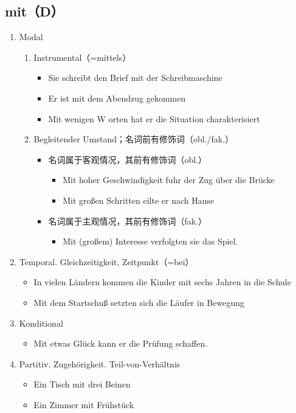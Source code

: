 \documentclass[UTF8]{report}
\begin{document}
\subsection{mit（D）}
\begin{enumerate}
    \item Modal
    \begin{enumerate}
        \item Instrumental（=mittels）
        \begin{itemize}
            \item Sie schreibt den Brief mit der Schreibmaschine
            \item Er ist mit dem Abendzug gekommen
            \item Mit wenigen W orten hat er die Situation charakterisiert
        \end{itemize}
        \item Begleitender Umstand；名词前有修饰词（obl./fak.）
        \begin{itemize}
            \item 名词属于客观情况，其前有修饰词（obl.）
            \begin{itemize}
                \item Mit hoher Geschwindigkeit fuhr der Zug über die Brücke
                \item Mit großen Schritten eilte er nach Hause
            \end{itemize}
            \item 名词属于主观情况，其前有修饰词（fak.）
            \begin{itemize}
                \item Mit (großem) Interesse verfolgten sie das Spiel.
            \end{itemize}
        \end{itemize}
    \end{enumerate}
    \item Temporal. Gleichzeitigkeit, Zeitpunkt（=bei）
    \begin{itemize}
        \item In vielen Ländern kommen die Kinder mit sechs Jahren in die Schule
        \item Mit dem Startschuß setzten sich die Läufer in Bewegung
    \end{itemize}
    \item Konditional
    \begin{itemize}
        \item Mit etwas Glück kann er die Prüfung schaffen.
    \end{itemize}
    \item Partitiv. Zugehörigkeit. Teil-von-Verhältnis
    \begin{itemize}
        \item Ein Tisch mit drei Beinen
        \item Ein Zimmer mit Frühstück
    \end{itemize}
\end{enumerate}
\end{document}
